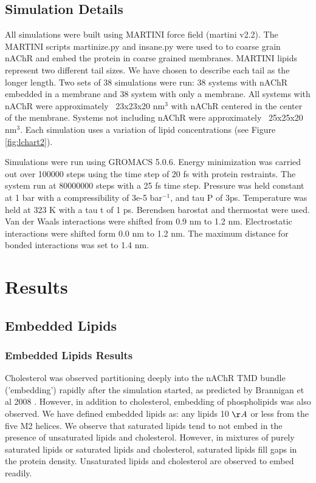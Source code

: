 \documentclass[10pt, letterpaper]{article}
\begin{document}
\subsection{Simulation Details}

All simulations were built using MARTINI force field (martini v2.2). The MARTINI scripts martinize.py and insane.py were used to to coarse grain nAChR and embed the protein in coarse grained membranes. MARTINI lipids represent two different tail sizes. We have chosen to describe each tail as the longer length. Two sets of 38 simulations were run: 38 systems with nAChR embedded in a membrane and 38 system with only a membrane. All systems with nAChR were approximately ~23x23x20 nm$^{3}$ with nAChR centered in the center of the membrane. Systems not including nAChR were approximately ~25x25x20 nm$^{3}$. Each simulation uses a variation of lipid concentrations (see Figure \ref{fig:lchart2}).

Simulations were run using GROMACS 5.0.6. Energy minimization was carried out over 100000 steps using the time step of 20 fs with protein restraints. The system run at 80000000 steps with a 25 fs time step. Pressure was held constant at 1 bar with a compressibility of 3e-5 bar$^{-1}$, and tau P of 3ps. Temperature was held at 323 K with a tau t of 1 ps. Berendsen barostat and thermostat were used. Van der Waals interactions were shifted from 0.9 nm to 1.2 nm. Electrostatic interactions were shifted form 0.0 nm to 1.2 nm. The maximum distance for bonded interactions was set to 1.4 nm. 
\newpage
\section{Results}

\subsection{Embedded Lipids}

\subsubsection{Embedded Lipids Results}

Cholesterol was observed partitioning deeply into the nAChR TMD bundle ('embedding') rapidly after the simulation started, as predicted by Brannigan et al 2008 \cite{branniganembedded2008}. However, in addition to cholesterol, embedding of phospholipids was also observed. We have defined embedded lipids as: any lipids 10 $\AA$ or less from the five M2 helices. We observe that saturated lipids tend to not embed in the presence of unsaturated lipids and cholesterol. However, in mixtures of purely saturated lipids or saturated lipids and cholesterol, saturated lipids fill gaps in the protein density. Unsaturated lipids and cholesterol are observed to embed readily. 
\end{document}
